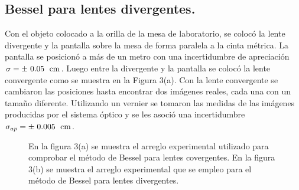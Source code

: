 \documentclass[DIV=calc, paper=a4, fontsize=10pt]{scrartcl}
\begin{document}
\subsection*{\textcolor{carmine}{Bessel para lentes divergentes.}}
Con el objeto colocado a la orilla de la mesa de laboratorio, se colocó la lente divergente y la pantalla sobre la mesa de forma paralela a la cinta métrica. La pantalla se posicionó a más de un metro con una incertidumbre de apreciación $\sigma=\pm\hspace{0.11cm}0.05\hspace{0.11cm}\text{ cm}$.
Luego entre la divergente y la pantalla se colocó la lente convergente como se muestra en la Figura 3(a). Con la lente convergente se cambiaron las posiciones hasta encontrar dos imágenes reales, cada una con un tamaño diferente. Utilizando un vernier se tomaron las medidas de las imágenes producidas por el sistema óptico y se les asoció una incertidumbre  $\sigma_{ap}=\pm\hspace{0.1cm}0.005\hspace{0.1cm}\text{ cm}$.
\begin{figure}[H]
    \centering
 \caption{En la figura 3(a) se muestra el arreglo experimental utilizado para comprobar el método de Bessel para lentes covergentes. En la figura 3(b) se muestra el arreglo experimental que se empleo para el método de Bessel para lentes divergentes.}
 \label{f:Desarrollo experimental}
\end{figure}
\end{document}
